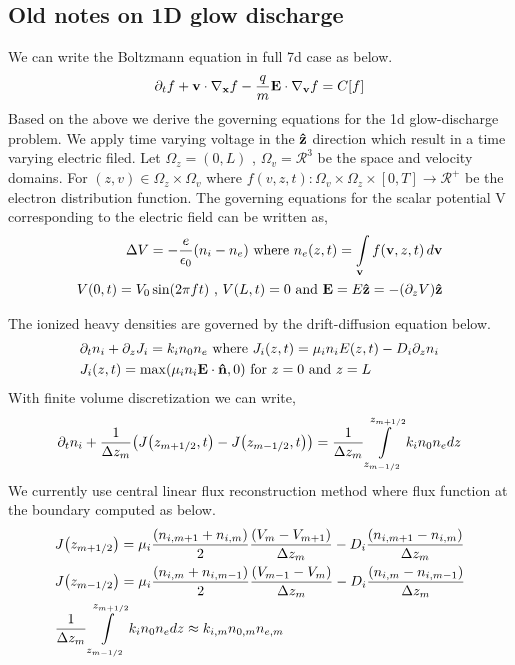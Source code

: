\documentclass{article}[draft]
\begin{document}
\subsection{Old notes on 1D glow discharge}
We can write the Boltzmann equation in full 7d case as below. 
\begin{align*}
\partial_t f + \mathbf{v}\cdot \nabla_{\mathbf{x}} f -\frac{q}{m} \mathbf{E} \cdot \nabla_{\mathbf{v}} f = C[f]
\end{align*}
Based on the above we derive the governing equations for the 1d glow-discharge problem. We apply time varying voltage in the $\mathbf{\hat{z}}$ direction which result in a time varying electric filed. Let $\Omega_z=(0, L)$ , $\Omega_v= \mathcal{R}^3$ be the space and velocity domains. For $(z, v) \in \Omega_{z} \times \Omega_v$ where $f (v, z, t) : \Omega_{v} \times \Omega_{z} × [0,T] \rightarrow \mathcal{R}^{+}$ be the electron distribution function. The governing equations for the scalar potential V corresponding to the electric field can be written as,
\begin{align*}
	\Delta V = -\frac{e}{\epsilon_0} (n_i-n_e) \text{ where } n_e(z,t) = \myint_{\vect{v}} f(\vect{v}, z, t) \diff{\vect{v}} \\
	V(0,t) = V_0 \sin(2\pi ft) \text{ , } V(L,t) = 0 \text{ and } \vect{E} = E \vect{\hat{z}} = -\of{\partial_z V} \vect{\hat{z}}
\end{align*} 

\par The ionized heavy densities are governed by the drift-diffusion equation below.
\begin{align*}
	&\partial_t n_i + \partial_z J_i = k_i n_0 n_e \text{ where } J_i\of{z, t} = \mu_i n_i E\of{z,t} -D_i \partial_z n_i\\
	&J_i(z,t)=\max\of{\mu_i n_i \vect{E}\cdot \vect{\hat{n}},0} \text{ for } z =0 \text{ and } z=L
\end{align*} With finite volume discretization we can write, 
\begin{align}
	\partial_t n_i + \frac{1}{\Delta z_m} \of{J\of{z_{m+1/2},t} - J\of{z_{m-1/2},t}} = \frac{1}{\Delta z_m}  \myint_{z_{m-1/2}}^{z_{m+1/2}} k_i n_0 n_e dz
\end{align} We currently use central linear flux reconstruction method where flux function at the boundary computed as below. 
\begin{align*}
&J\of{z_{m+1/2}} = \mu_i \frac{\of{n_{i,m+1} + n_{i,m}}}{2} \frac{\of{V_m-V_{m+1}}}{\Delta z_m} - D_i \frac{\of{n_{i, m+1} -n_{i, m}}}{\Delta z_m} \\
&J\of{z_{m-1/2}} = \mu_i \frac{\of{n_{i,m} + n_{i,m-1}}}{2} \frac{\of{V_{m-1}-V_{m}}}{\Delta z_m} - D_i \frac{\of{n_{i, m} -n_{i, m-1}}}{\Delta z_m} \\
&\frac{1}{\Delta z_m}  \myint_{z_{m-1/2}}^{z_{m+1/2}}  k_i n_0 n_e dz \approx k_{i,m} n_{0,m} n_{e,m} 
\end{align*}
\end{document}
